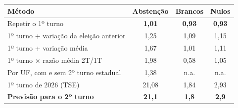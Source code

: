 \begin{tabular}{lccc}
\toprule
\textbf{Método} & \textbf{Abstenção} & \textbf{Brancos} & \textbf{Nulos} \\
\midrule
Repetir o 1º turno & \textbf{1,01} & \textbf{0,93} & \textbf{0,93} \\
1º turno + variação da eleição anterior & 1,25 & 1,09 & 1,15 \\
1º turno + variação média & 1,67 & 1,01 & 1,11 \\
1º turno $\times$ razão média 2T/1T & 1,98 & 0,58 & 1,05 \\
Por UF, com e sem 2º turno estadual & 1,38 & n.a. & n.a. \\
\midrule
1º turno de 2026 (TSE) & 21,08 & 1,84 & 2,93 \\
\textbf{Previsão para o 2º turno} & \textbf{21,1} & \textbf{1,8} & \textbf{2,9} \\
\bottomrule
\end{tabular}
